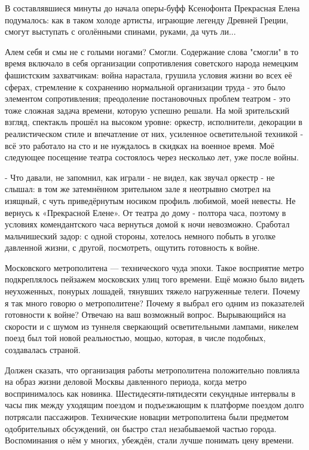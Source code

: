 В составлявшиеся минуты до начала оперы-буфф Ксенофонта Прекрасная Елена подумалось: как в таком холоде артисты, играющие легенду Древней Греции, смогут выступать с оголёнными спинами, руками, да чуть ли...

\label{232-1}
Алем себя и смы не с голыми ногами? Смогли. Содержание слова "смогли" в то время включало в себя организации сопротивления советского народа немецким фашистским захватчикам: война нарастала, грушила условия жизни во всех её сферах, стремление к сохранению нормальной организации труда - это было элементом сопротивления; преодоление постановочных проблем театром - это тоже сложная задача времени, которую успешно решали. На мой зрительский взгляд, спектакль прошёл на высоком уровне: оркестр, исполнители, декорации в реалистическом стиле и впечатление от них, усиленное осветительной техникой - всё это работало на сто и не нуждалось в скидках на военное время. Моё следующее посещение театра состоялось через несколько лет, уже после войны.

\label{233-1}
- Что давали, не запомнил, как играли - не видел, как звучал оркестр - не слышал: в том же затемнённом зрительном зале я неотрывно смотрел на изящный, с чуть приведёрнутым носиком профиль любимой, моей невесты. Не вернусь к «Прекрасной Елене».
От театра до дому - полтора часа, поэтому в условиях комендантского часа вернуться домой к ночи невозможно. Сработал мальчишеский задор: с одной стороны, хотелось немного побыть в уголке давленной жизни, с другой, посмотреть, ощутить готовность к войне.

\label{234-1}
Московского метрополитена — технического чуда эпохи. Такое восприятие метро подкреплялось пейзажем московских улиц того времени. Ещё можно было видеть неухоженных, понурых лошадей, тянувших тяжело нагруженные телеги.
Почему я так много говорю о метрополитене? Почему я выбрал его одним из показателей готовности к войне? Отвечаю на ваш возможный вопрос. Вырывающийся на скорости и с шумом из туннеля сверкающий осветительными лампами, никелем поезд был той новой реальностью, мощью, которая, в числе подобных, создавалась страной.

\label{235-1}
Должен сказать, что организация работы метрополитена положительно повлияла на образ жизни деловой Москвы давленного периода, когда метро воспринималось как новинка. Шестидесяти-пятидесяти секундные интервалы в часы пик между уходящим поездом и подъезжающим к платформе поездом долго потрясали пассажиров. Технические новации метрополитена были предметом одобрительных обсуждений, он быстро стал незабываемой частью города. Воспоминания о нём у многих, убеждён, стали лучше понимать цену времени.

